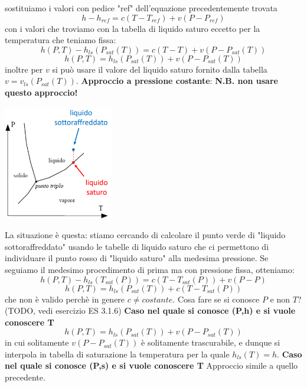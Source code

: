 \newline
sostituiamo i valori con pedice "ref" dell'equazione precedentemente trovata
\[
    h - h_{ref} = c(T-T_{ref}) + v (P-P_{ref})
\]
con i valori che troviamo con la tabella di liquido saturo eccetto per la temperatura che teniamo fissa:
\[
    h(P,T) - h_{ls}(P_{sat}(T)) = c(T - T) + v (P - P_{sat}(T))
\]
\[
    h(P,T) = h_{ls} (P_{sat}(T)) + v (P-P_{sat}(T))
\]
inoltre per $v$ si può usare il valore del liquido saturo fornito dalla tabella $v = v_{ls}(P_{sat}(T))$.\newline
\newline
\textbf{Approccio a pressione costante}:\newline
\textbf{N.B. non usare questo approccio!}
\begin{center}
    \includegraphics[height=5cm]{../L04/img13.PNG}
\end{center}
La situazione è questa: stiamo cercando di calcolare il punto verde di "liquido sottoraffreddato" usando le tabelle di liquido saturo che ci permettono di individuare il punto rosso di "liquido saturo" alla medesima pressione.\newline
Se seguiamo il medesimo procedimento di prima ma con pressione fissa, otteniamo:
\[
    h(P,T) - h_{ls}(T_{sat}(P)) = c (T-T_{sat}(P)) + v(P-P)
\]
\[
    h(P,T) = h_{ls}(P_{sat} (T)) + c (T-T_{sat}(P))
\]
che non è valido perchè in genere $c \neq costante$.\newline
Cosa fare se si conosce $P$ e non $T$? (TODO, vedi esercizio ES 3.1.6)\newline
\newline
\textbf{Caso nel quale si conosce (P,h) e si vuole conoscere T}\newline
\[
    h(P,T) = h_{ls}(P_{sat}(T)) + v(P-P_{sat}(T))
\]
in cui solitamente $v (P-P_{sat}(T))$ è solitamente trascurabile, e dunque si interpola in tabella di saturazione la temperatura per la quale $h_{ls}(T) = h$.\newline
\newline
\textbf{Caso nel quale si conosce (P,s) e si vuole conoscere T}\newline
Approccio simile a quello precedente.
